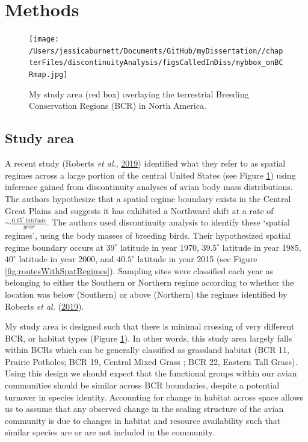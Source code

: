 \documentclass[12pt,twoside,openany]{reedthesis}
\begin{document}
\hypertarget{methods-2}{%
\section{Methods}\label{methods-2}}
\begin{figure}
\centering
\texttt{[image: /Users/jessicaburnett/Documents/GitHub/myDissertation//chapterFiles/discontinuityAnalysis/figsCalledInDiss/mybbox\_onBCRmap.jpg]}
\caption{\label{fig:studyarea}My study area (red box) overlaying the terrestrial Breeding Conservation Regions (BCR) in North America.}
\end{figure}
\hypertarget{study-area-1}{%
\subsection{Study area}\label{study-area-1}}

A recent study (Roberts \emph{et al.}, \protect\hyperlink{ref-roberts2019shifting}{2019}) identified what they refer to as spatial regimes across a large portion of the central United States (see Figure \ref{fig:studyarea}) using inference gained from discontinuity analyses of avian body mass distributions. The authors hypothesize that a spatial regime boundary exists in the Central Great Plains and suggests it has exhibited a Northward shift at a rate of \(\sim\frac{0.05^\circ\ latitude}{year}\). The authors used discontinuity analysis to identify these `spatial regimes', using the body masses of breeding birds. Their hypothesized spatial regime boundary occurs at \(39^\circ\) latitude in year 1970, \(39.5^\circ\) latitude in year 1985, \(40^\circ\) latitude in year 2000, and \(40.5^\circ\) latitude in year 2015 (see Figure \ref{fig:routesWithSpatRegimes}). Sampling sites were classified each year as belonging to either the Southern or Northern regime according to whether the location was below (Southern) or above (Northern) the regimes identified by Roberts \emph{et al.} (\protect\hyperlink{ref-roberts2019shifting}{2019}).

My study area is designed such that there is minimal crossing of very different BCR, or habitat types (Figure \ref{fig:studyarea}). In other words, this study area largely falls within BCRs which can be generally classified as grassland habitat (BCR 11, Prairie Potholes; BCR 19, Central Mixed Grass ; BCR 22, Eastern Tall Grass). Using this design we should expect that the functional groups within our avian communities should be similar across BCR boundaries, despite a potential turnover in species identity. Accounting for change in habitat across space allows us to assume that any observed change in the scaling structure of the avian community is due to changes in habitat and resource availability such that similar species are or are not included in the community.
\end{document}
